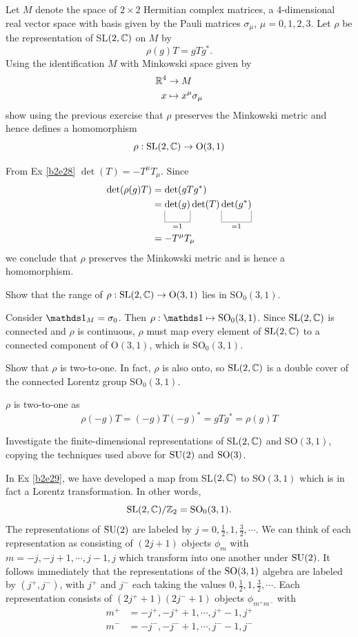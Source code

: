 \documentclass[10pt]{article}
\begin{document}
\begin{example}\label{b2e29}
	Let $M$ denote the space of $2\times2$ Hermitian complex matrices, a 4-dimensional real vector space with basis given by the Pauli matrices $\sigma_\mu$, $\mu=0,1,2,3$. Let $\rho$ be the representation of SL$(2,\mathbb{C})$ on $M$ by
	$$
	\rho(g)T=gTg^*.
	$$
	Using the identification $M$ with Minkowski space given by
	$$
	\begin{aligned}
		\mathbb{R}^4 &\to M\\
		x &\mapsto x^\mu \sigma_\mu
	\end{aligned}
	$$
	show using the previous exercise that $\rho$ preserves the Minkowski metric and hence defines a homomorphism
	$$
	\rho:\text{SL}(2,\mathbb{C})\to \text{O}(3,1)
	$$
\end{example}
\sol From Ex \ref{b2e28} $\det (T) = -T^\mu T_\mu$. Since
$$
\begin{aligned}
	\det(\rho(g) T) &= \det(gTg^*)\\
	&= \ub{\det(g)}{=1}\det(T)\ub{\det(g^*)}{=1}\\
	&= -T^\mu T_\mu
\end{aligned}
$$
we conclude that $\rho$ preserves the Minkowski metric and is hence a homomorphism.


\begin{example}
	Show that the range of $\rho:\text{SL}(2,\mathbb{C})\to\text{O}(3,1)$ lies in SO$_0(3,1)$.
\end{example}
\sol Consider $\id_M = \sigma_0$. Then $\rho:\id\mapsto\SO_0(3,1)$. Since $\text{SL}(2,\mathbb{C})$ is connected and $\rho$ is continuous, $\rho$ must map every element of $\text{SL}(2,\mathbb{C})$ to a connected component of $\text{O}(3,1)$, which is SO$_0(3,1)$.


\begin{example}
	Show that $\rho$ is two-to-one. In fact, $\rho$ is also onto, so $\text{SL}(2,\mathbb{C})$ is a double cover of the connected Lorentz group SO$_0(3,1)$.
\end{example}
\sol $\rho$ is two-to-one as
$$
\rho(-g)T = (-g)T(-g)^* = gTg^* = \rho(g)T
$$


\begin{example}
	Investigate the finite-dimensional representations of SL$(2,\mathbb{C})$ and SO$(3,1)$, copying the techniques used above for $\text{SU}(2)$ and $\text{SO}(3)$.
\end{example}
\sol In Ex \ref{b2e29}, we have developed a map from SL$(2,\mathbb{C})$ to SO$(3,1)$ which is in fact a Lorentz transformation. In other words,
$$
\text{SL}(2,\mathbb{C})/\mathbb{Z}_2 = \text{SO}_0(3,1).
$$
The representations of $\text{SU}(2)$ are labeled by $j = 0,\frac12,1,\frac32,\cdots$. We can think of each representation as consisting of $(2j + 1)$ objects $\phi_m$ with $m = -j, -j + 1,\cdots,j - 1, j$ which transform into one another under $\text{SU}(2)$. It follows immediately that the representations of the $\text{SO}(3,1)$ algebra are labeled by $(j^+,j^-)$, with $j^+$ and $j^-$ each taking the values $0,\frac12,1,\frac32,\cdots$. Each representation consists of $(2j^+ + 1)(2j^- + 1)$ objects $\phi_{m^+m^-}$ with
$$
\begin{aligned}
	m^+ &= -j^+, -j^+ + 1,\cdots,j^+ - 1, j^+\\
	m^- &= -j^-, -j^- + 1,\cdots,j^- - 1, j^-
\end{aligned}
$$
\end{document}
